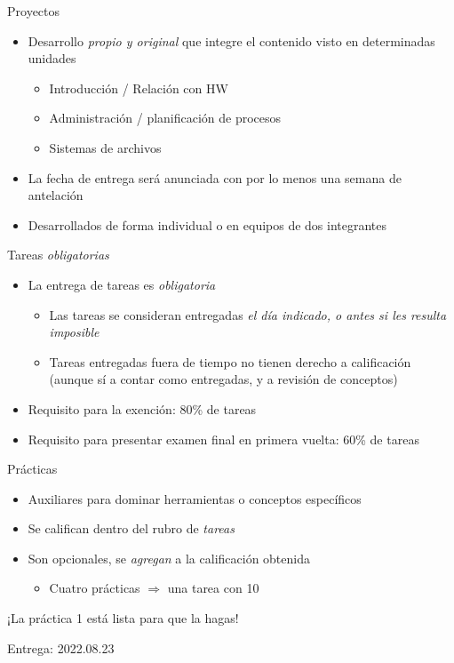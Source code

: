 \documentclass[presentation]{beamer}
\begin{document}
\begin{frame}[label={sec:orgf2e75da}]{Proyectos}
\begin{itemize}
\item Desarrollo \emph{propio y original} que integre el contenido visto en
determinadas unidades
\begin{itemize}
\item Introducción / Relación con HW
\item Administración / planificación de procesos
\item Sistemas de archivos
\end{itemize}
\item La fecha de entrega será anunciada con por lo menos una semana de
antelación
\item Desarrollados de forma individual o en equipos de dos integrantes
\end{itemize}
\end{frame}

\begin{frame}[label={sec:org6153796}]{Tareas \emph{obligatorias}}
\begin{itemize}
\item La entrega de tareas es \emph{obligatoria}
\begin{itemize}
\item Las tareas se consideran entregadas \emph{el día indicado, o antes si
les resulta imposible}
\item Tareas entregadas fuera de tiempo \alert{no tienen derecho a
calificación} (aunque sí a contar como entregadas, y a revisión de
conceptos)
\end{itemize}
\item Requisito para la exención: \alert{80\%} de tareas
\item Requisito para presentar examen final en primera vuelta: \alert{60\%} de tareas
\end{itemize}
\end{frame}

\begin{frame}[label={sec:orgfb1dc7c}]{Prácticas}
\begin{itemize}
\item Auxiliares para dominar herramientas o conceptos específicos
\item Se califican dentro del rubro de \emph{tareas}
\item Son opcionales, se \emph{agregan} a la calificación obtenida
\begin{itemize}
\item Cuatro prácticas \(\Rightarrow\) una tarea con 10
\end{itemize}
\end{itemize}
\pause
\begin{center}
\alert{¡La práctica 1 está lista para que la hagas!}

Entrega: 2022.08.23
\end{center}
\end{frame}
\end{document}
